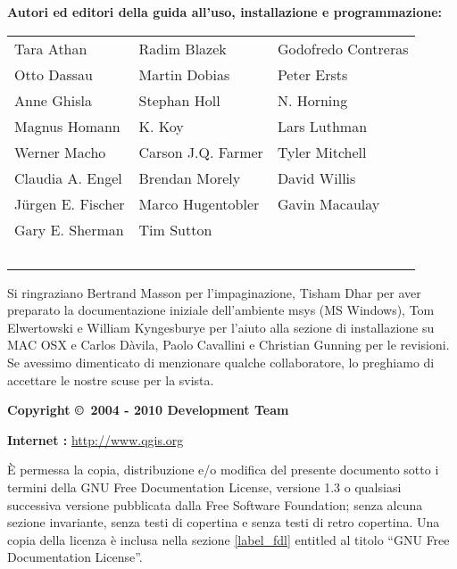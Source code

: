 \newpage

\begin{flushleft}
\textbf{Autori ed editori della guida all’uso, installazione e programmazione:}
  \par\bigskip\noindent
\begin{tabular}{p{4cm} p{4cm} p{4cm}}
Tara Athan & Radim Blazek & Godofredo Contreras \\
Otto Dassau & Martin Dobias & Peter Ersts \\
Anne Ghisla & Stephan Holl & N. Horning \\
Magnus Homann & K. Koy & Lars Luthman \\ 
Werner Macho & Carson J.Q. Farmer & Tyler Mitchell \\
Claudia A. Engel & Brendan Morely & David Willis \\
Jürgen E. Fischer & Marco Hugentobler & Gavin Macaulay \\
Gary E. Sherman & Tim Sutton \\ \
\end{tabular}
\end{flushleft}

Si ringraziano Bertrand Masson per l’impaginazione, Tisham Dhar per aver preparato 
la documentazione iniziale dell’ambiente msys (MS Windows), Tom Elwertowski e William 
Kyngesburye per l’aiuto alla sezione di installazione su MAC OSX e Carlos Dàvila, 
Paolo Cavallini e Christian Gunning per le revisioni. Se avessimo dimenticato di 
menzionare qualche collaboratore, lo preghiamo di accettare le nostre scuse per la svista.
\par\bigskip\noindent
\textbf{Copyright \copyright~2004 - 2010 \QG Development Team}
\par\bigskip\noindent
\textbf{Internet :} \url{http://www.qgis.org}


È permessa la copia, distribuzione e/o modifica del presente documento sotto i termini della GNU
Free Documentation License, versione 1.3 o qualsiasi successiva versione pubblicata dalla Free 
Software Foundation; senza alcuna sezione invariante, senza testi di copertina e senza testi di retro copertina. 
Una copia della licenza è inclusa nella sezione \ref{label_fdl} entitled al titolo “GNU Free Documentation License”.

\newpage
